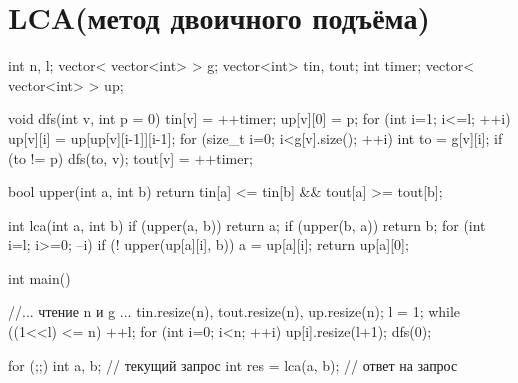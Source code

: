 \documentclass[12pt, titlepage]{article}
\begin{document}
\section{LCA(метод двоичного подъёма)}
\begin{cppcode}
int n, l;
vector< vector<int> > g;
vector<int> tin, tout;
int timer;
vector< vector<int> > up;

void dfs(int v, int p = 0) {
    tin[v] = ++timer;
    up[v][0] = p;
    for (int i=1; i<=l; ++i)
        up[v][i] = up[up[v][i-1]][i-1];
    for (size_t i=0; i<g[v].size(); ++i) {
        int to = g[v][i];
        if (to != p)
            dfs(to, v);
    }
    tout[v] = ++timer;
}

bool upper(int a, int b) {
    return tin[a] <= tin[b] && tout[a] >= tout[b];
}

int lca(int a, int b) {
    if (upper(a, b))  return a;
    if (upper(b, a))  return b;
    for (int i=l; i>=0; --i)
        if (! upper(up[a][i], b))
            a = up[a][i];
    return up[a][0];
}

int main() {
    //... чтение n и g ...
    tin.resize(n),  tout.resize(n),  up.resize(n);
    l = 1;
    while ((1<<l) <= n)  ++l;
    for (int i=0; i<n; ++i)  up[i].resize(l+1);
    dfs(0);

    for (;;) {
        int a, b; // текущий запрос
        int res = lca(a, b); // ответ на запрос
    }

}
\end{cppcode}
\end{document}
